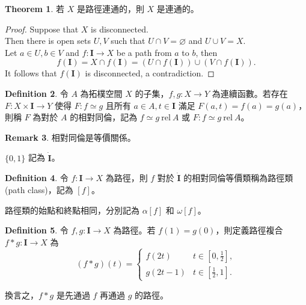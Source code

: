 \documentclass[12pt]{article}
\theoremstyle{definition}
\newtheorem{definition}{Definition}[section]
\newtheorem{theorem}[definition]{Theorem}
\newtheorem{remark}[definition]{Remark}
\newcommand\<{\langle}
\renewcommand\>{\rangle}
\newcommand\rel{\ \mathrm{rel}\ }
\begin{document}
\begin{CJK}{UTF8}{bsmi}
\begin{theorem}
    若 $X$ 是路徑連通的，則 $X$ 是連通的。
\end{theorem}
\begin{proof}
    Suppose that $X$ is disconnected. \\
    Then there is open sets $U, V$ such that $U\cap V=\varnothing$ and $U\cup V=X$. \\
    Let $a\in U, b\in V$ and $f:\textbf{I}\to X$ be a path from $a$ to $b$, then
    \[
        f(\textbf{I})=X\cap f(\textbf{I})=(U\cap f(\textbf{I}))\cup(V\cap f(\textbf{I})).
    \]
    It follows that $f(\textbf{I})$ is disconnected, a contradiction.
\end{proof}

\begin{definition}
    令 $A$ 為拓樸空間 $X$ 的子集，$f, g:X\to Y$ 為連續函數。若存在 $F:X\times\textbf{I}\to Y$ 使得 $F:f\simeq g$ 且所有 $a\in A, t\in\textbf{I}$ 滿足 $F(a, t)=f(a)=g(a)$，則稱 $F$ 為對於 $A$ 的相對同倫，記為 $f\simeq g\rel A$ 或 $F:f\simeq g\rel A$。
\end{definition}

\begin{remark}
    相對同倫是等價關係。
\end{remark}

$\{0, 1\}$ 記為 $\Dot{\textbf{I}}$。

\begin{definition}
    令 $f:\textbf{I}\to X$ 為路徑，則 $f$ 對於 $\Dot{\textbf{I}}$ 的相對同倫等價類稱為路徑類 (path class)，記為 $[f]$。
\end{definition}

路徑類的始點和終點相同，分別記為 $\alpha[f]$ 和 $\omega[f]$。

\begin{definition}
    令 $f, g:\textbf{I}\to X$ 為路徑。若 $f(1)=g(0)$，則定義路徑複合 $f*g:\textbf{I}\to X$ 為
    \[
        (f*g)(t) = \begin{cases}
            f(2t) & t\in[0, \frac{1}{2}], \\
            g(2t-1) & t\in[\frac{1}{2}, 1].
        \end{cases}
    \]
\end{definition}

換言之，$f*g$ 是先通過 $f$ 再通過 $g$ 的路徑。


\end{CJK}
\end{document}
